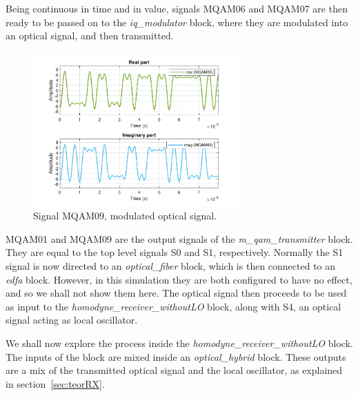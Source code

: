 	Being continuous in time and in value, signals MQAM06 and MQAM07 are then 
	ready to be passed on to the 
	\textit{iq\_modulator} block, where they are modulated into an optical 
	signal, and then transmitted.

	\begin{figure}[H]
	\centering
		\centering
		\includegraphics[width=0.7\textwidth]		
		{./sdf/m_qam_system/figures/simulations/01_noISI/MQAM09.pdf}
	\caption{Signal MQAM09, modulated optical signal.}\label{fig:ISImqam9}
\end{figure}

	MQAM01 and MQAM09 are the output signals of the \textit{m\_qam\_transmitter} 
	block. They are equal to the top level signals S0 and S1, respectively.
	Normally the S1 signal is now directed to an \textit{optical\_fiber} block, 
	which is then connected to an \textit{edfa} block. However, in this 
	simulation they are both configured to have no effect, and so we shall not 
	show them here. The optical signal then proceeds to be used as input to the 
	\textit{homodyne\_receiver\_withoutLO} block, along with S4, an optical 
	signal acting as local oscillator.
	
	We shall now explore the process inside the 
	\textit{homodyne\_receiver\_withoutLO} 
	block. The inputs of the block are mixed inside an \textit{optical\_hybrid} 
	block. These outputs are a mix of the transmitted optical signal and the 
	local oscillator, as explained in 
	section~\ref{sec:teorRX}.
	
